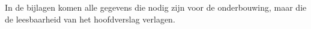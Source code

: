 
In de bijlagen komen alle gegevens die nodig zijn voor de
onderbouwing, maar die de leesbaarheid van het hoofdverslag verlagen.







